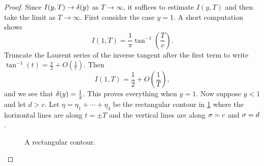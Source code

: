     \begin{proof}
      Since \(I(y,T) \to \delta(y)\) as \(T \to \infty\), it suffices to estimate \(I(y,T)\) and then take the limit as \(T \to \infty\). First consider the case \(y = 1\). A short computation shows
      \[
        I(1,T) = \frac{1}{\pi}\tan^{-1}\left(\frac{T}{c}\right).
      \]
      Truncate the Laurent series of the inverse tangent after the first term  to write \(\tan^{-1}(t) = \frac{\pi}{2}+O\left(\frac{1}{t}\right)\). Then
      \[
        I(1,T) = \frac{1}{2}+O\left(\frac{1}{T}\right),
      \] 
      and we see that \(\delta(y) = \frac{1}{2}\). This proves everything when \(y = 1\). Now suppose \(y < 1\) and let \(d > c\). Let \(\eta = \eta_{1}+\cdots+\eta_{4}\) be the rectangular contour in \cref{fig:discontinuous_integral_contour_1} where the horizontal lines are along \(t = \pm T\) and the vertical lines are along \(\sigma = c\) and \(\sigma = d\).

      \begin{figure}[h]
        \centering
        \caption{A rectangular contour.}
        \label{fig:discontinuous_integral_contour_1}
      \end{figure}


\end{proof}
